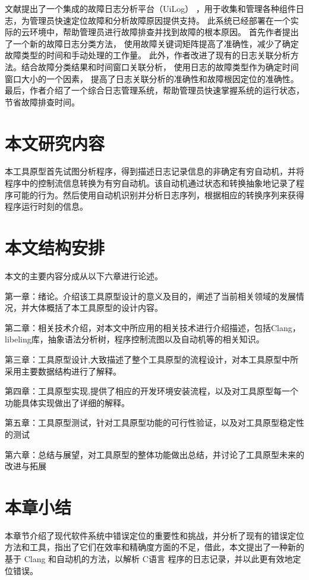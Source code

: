 文献\cite{zou2014improving}提出了一个集成的故障日志分析平台（UiLog）
，用于收集和管理各种组件日志，为管理员快速定位故障和分析故障原因提供支持。
此系统已经部署在一个实际的云环境中，帮助管理员进行故障排查并找到故障的根本原因。
首先作者提出了一个新的故障日志分类方法，
使用故障关键词矩阵提高了准确性，减少了确定故障类型的时间和手动处理的工作量。
此外，作者改进了现有的日志关联分析方法。结合故障分类结果和时间窗口关联分析，
使用日志的故障类型作为确定时间窗口大小的一个因素，
提高了日志关联分析的准确性和故障根因定位的准确性。
最后，作者介绍了一个综合日志管理系统，帮助管理员快速掌握系统的运行状态，节省故障排查时间。


\section{本文研究内容}
本工具原型首先试图分析程序，得到描述日志记录信息的非确定有穷自动机，并将程序中的控制流信息转换为有穷自动机。该自动机通过状态和转换抽象地记录了程序可能的行为。然后使用自动机识别并分析日志序列，根据相应的转换序列来获得程序运行时刻的信息。

\section{本文结构安排}
本文的主要内容分成从以下六章进行论述。

第一章：绪论。介绍该工具原型设计的意义及目的，阐述了当前相关领域的发展情况，并大体概括了本工具原型的设计内容。

第二章：相关技术介绍，对本文中所应用的相关技术进行介绍描述，包括Clang，libeling库，抽象语法分析树，程序控制流图以及自动机等的相关知识。

第三章：工具原型设计,大致描述了整个工具原型的流程设计，对本工具原型中所采用主要数据结构进行了解释。

第四章：工具原型实现,提供了相应的开发环境安装流程，以及对工具原型每一个功能具体实现做出了详细的解释。

第五章：工具原型测试，针对工具原型功能的可行性验证，以及对工具原型稳定性的测试

第六章：总结与展望，对工具原型的整体功能做出总结，并讨论了工具原型未来的改进与拓展
\section{本章小结}
本章节介绍了现代软件系统中错误定位的重要性和挑战，并分析了现有的错误定位方法和工具，指出了它们在效率和精确度方面的不足，借此，本文提出了一种新的基于 Clang 和自动机的方法，以解析 C语言 程序的日志记录，并以此更有效地定位错误。

